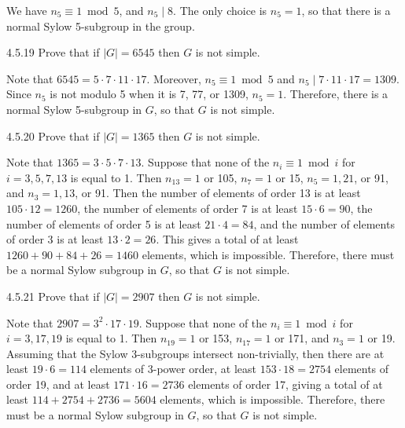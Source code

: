 \begin{sol}
	We have $n_5 \equiv 1 \bmod 5$, and $n_5 \mid 8$.
	The only choice is $n_5 = 1$, so that there is a normal Sylow 5-subgroup in the group.
\end{sol}

\begin{exercise}{4.5.19}
	Prove that if $|G| = 6545$ then $G$ is not simple.
\end{exercise}

\begin{sol}
	Note that $6545 = 5 \cdot 7 \cdot 11 \cdot 17$.
	Moreover, $n_5 \equiv 1 \bmod 5$ and $n_5 \mid 7 \cdot 11 \cdot 17 = 1309$.
	Since $n_5$ is not modulo 5 when it is 7, 77, or 1309, $n_5 = 1$.
	Therefore, there is a normal Sylow 5-subgroup in $G$, so that $G$ is not simple.
\end{sol}

\begin{exercise}{4.5.20}
	Prove that if $|G| = 1365$ then $G$ is not simple.
\end{exercise}

\begin{sol}
	Note that $1365 = 3 \cdot 5 \cdot 7 \cdot 13$.
	Suppose that none of the $n_i \equiv 1 \bmod i$ for $i = 3, 5, 7, 13$ is equal to 1.
	Then $n_{13} = 1$ or 105, $n_7 = 1$ or 15, $n_5 = 1, 21$, or 91, and $n_3 = 1, 13$, or 91.
	Then the number of elements of order 13 is at least $105 \cdot 12 = 1260$, the number of elements of order 7 is at least $15 \cdot 6 = 90$, the number of elements of order 5 is at least $21 \cdot 4 = 84$, and the number of elements of order 3 is at least $13 \cdot 2 = 26$.
	This gives a total of at least $1260 + 90 + 84 + 26 = 1460$ elements, which is impossible.
	Therefore, there must be a normal Sylow subgroup in $G$, so that $G$ is not simple.
\end{sol}

\begin{exercise}{4.5.21}
	Prove that if $|G| = 2907$ then $G$ is not simple.
\end{exercise}

\begin{sol}
	Note that $2907 = 3^2 \cdot 17 \cdot 19$.
	Suppose that none of the $n_i \equiv 1 \bmod i$ for $i = 3, 17, 19$ is equal to 1.
	Then $n_{19} = 1$ or 153, $n_{17} = 1$ or 171, and $n_3 = 1$ or 19.
	Assuming that the Sylow 3-subgroups intersect non-trivially, then there are at least $19 \cdot 6 = 114$ elements of 3-power order, at least $153 \cdot 18 = 2754$ elements of order 19, and at least $171 \cdot 16 = 2736$ elements of order 17, giving a total of at least $114 + 2754 + 2736 = 5604$ elements, which is impossible.
	Therefore, there must be a normal Sylow subgroup in $G$, so that $G$ is not simple.
\end{sol}

